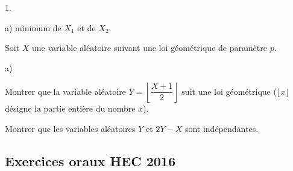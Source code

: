 \begin{exerciceAP}
\begin{noliste}{1.}
\begin{noliste}{a)}
      minimum de $X_1$ et de $X_2$.
    \end{noliste}
  \item Soit $X$ une variable aléatoire suivant une loi géométrique de
    paramètre $p$.
    \begin{noliste}{a)}
      \setlength{\itemsep}{2mm}
    \item Montrer que la variable aléatoire $Y = \left\lfloor
        \dfrac{X+1}{2} \right\rfloor$ suit une loi géométrique
      ($\lfloor x \rfloor$ désigne la partie entière du nombre $x$).
    \item Montrer que les variables aléatoires $Y$ et $2Y - X$ sont
      indépendantes.
    \end{noliste}
  \end{noliste}
\end{exerciceAP} 


\subsection*{Exercices oraux HEC 2016}


